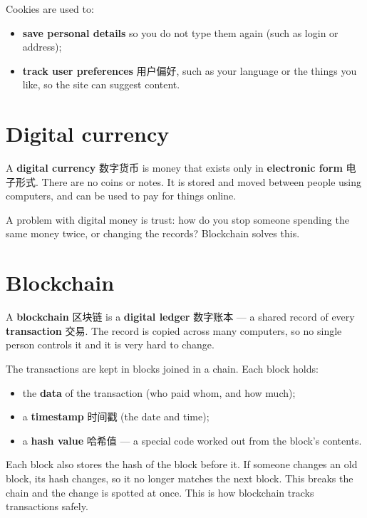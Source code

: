 \documentclass[11pt]{article}
\begin{document}
Cookies are used to:

\begin{itemize}
\item \textbf{save personal details} so you do not type them again (such as login or address);

\item \textbf{track user preferences} 用户偏好, such as your language or the things you like, so the site can suggest content.

\end{itemize}

\section*{Digital currency}

A \textbf{digital currency} 数字货币 is money that exists only in \textbf{electronic form} 电子形式. There are no coins or notes. It is stored and moved between people using computers, and can be used to pay for things online.

A problem with digital money is trust: how do you stop someone spending the same money twice, or changing the records? Blockchain solves this.

\section*{Blockchain}

A \textbf{blockchain} 区块链 is a \textbf{digital ledger} 数字账本 — a shared record of every \textbf{transaction} 交易. The record is copied across many computers, so no single person controls it and it is very hard to change.

The transactions are kept in blocks joined in a chain. Each block holds:

\begin{itemize}
\item the \textbf{data} of the transaction (who paid whom, and how much);

\item a \textbf{timestamp} 时间戳 (the date and time);

\item a \textbf{hash value} 哈希值 — a special code worked out from the block's contents.

\end{itemize}

Each block also stores the hash of the block before it. If someone changes an old block, its hash changes, so it no longer matches the next block. This breaks the chain and the change is spotted at once. This is how blockchain tracks transactions safely.
\end{document}
